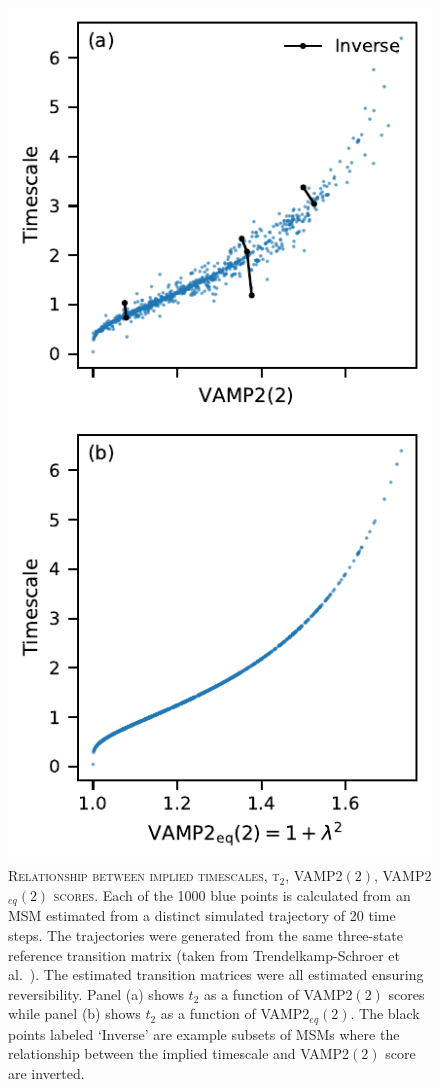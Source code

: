 \documentclass[journal=jacsat,manuscript=article]{achemso}
\begin{document}
\begin{figure}[ht]
    \centering
    \includegraphics{results2/timescale_vs_vamp_vs_evs.pdf}
    \caption{\textsc{Relationship between implied timescales, t$_2$, VAMP2$(2)$, VAMP2$_{eq}(2)$ scores}.  Each of the \num{1000} blue points is calculated from an MSM estimated from a distinct simulated trajectory of 20 time steps. The trajectories were generated from the same three-state reference transition matrix (taken from Trendelkamp-Schroer et al.~\cite{trendelkamp-schroer_estimation_2015}). The estimated transition matrices were all estimated ensuring reversibility. Panel (a) shows $t_2$ as a function of VAMP2$(2)$ scores while panel (b) shows  $t_2$ as a function of VAMP2$_{eq}(2)$. The black points labeled `Inverse' are example subsets of MSMs where the relationship between the implied timescale and VAMP2$(2)$ score are inverted.}
    \label{fig:bad_vamps_examples}
\end{figure}
\end{document}

